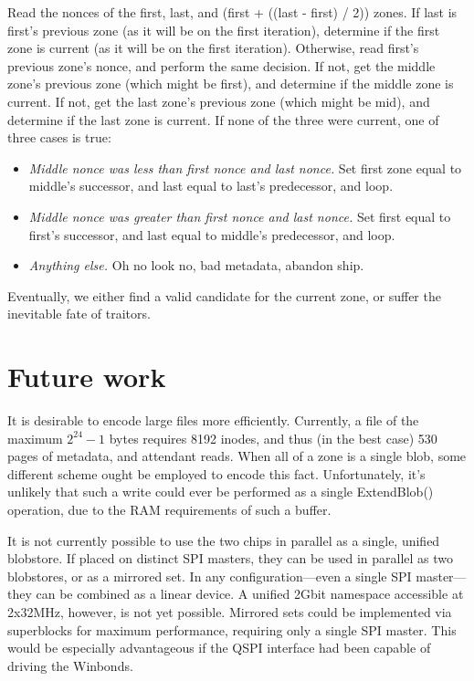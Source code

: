 \documentclass[letterpaper,10pt]{article}
\newenvironment{denseitemize}{
  \begin{itemize}
      \setlength{\itemsep}{0pt}
}{
  \end{itemize}
}
\begin{document}
Read the nonces of the first, last, and (first + ((last - first) / 2)) zones.
If last is first's previous zone (as it will be on the first iteration),
determine if the first zone is current (as it will be on the first iteration).
Otherwise, read first's previous zone's nonce, and perform the same
decision. If not, get the middle zone's previous zone (which might be first),
and determine if the middle zone is current. If not, get the last zone's previous
zone (which might be mid), and determine if the last zone is current. If none
of the three were current, one of three cases is true:
\begin{denseitemize}
\item \textit{Middle nonce was less than first nonce and last nonce.} Set first zone
  equal to middle's successor, and last equal to last's predecessor, and loop.
\item \textit{Middle nonce was greater than first nonce and last nonce.} Set
  first equal to first's successor, and last equal to middle's predecessor, and
  loop.
\item \textit{Anything else.} Oh no look no, bad metadata, abandon ship.
\end{denseitemize}
Eventually, we either find a valid candidate for the current zone, or
suffer the inevitable fate of traitors.

\section{Future work} \label{futurework}
It is desirable to encode large files more efficiently. Currently, a file of
the maximum $2^{24}-1$ bytes requires 8192 inodes, and thus (in the best case)
530 pages of metadata, and attendant reads. When all of a zone is a single
blob, some different scheme ought be employed to encode this fact.
Unfortunately, it's unlikely that such a write could ever be performed as a
single ExtendBlob() operation, due to the RAM requirements of such a buffer.

It is not currently possible to use the two chips in parallel as a single,
unified blobstore. If placed on distinct SPI masters, they can be used in
parallel as two blobstores, or as a mirrored set. In any configuration---even
a single SPI master---they can be combined as a linear device. A unified
2Gbit namespace accessible at 2x32MHz, however, is not yet possible. Mirrored
sets could be implemented via superblocks for
maximum performance, requiring only a single SPI master. This would be especially
advantageous if the QSPI interface had been capable of driving the Winbonds.
\end{document}
